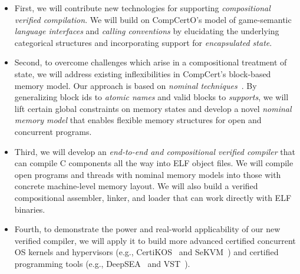 \begin{itemize} \itemsep 0pt
\item First, we will contribute new technologies for supporting {\em
  compositional verified compilation}.
  We will build on CompCertO's model of
  game-semantic {\em language interfaces} and {\em calling conventions}
  by elucidating the underlying categorical structures
  and incorporating support for {\em encapsulated state}.
\item Second, to overcome challenges which arise
  in a compositional treatment of state,
  we will address existing inflexibilities
  in CompCert's block-based memory model.
  Our approach is based on \emph{nominal
  techniques}~\cite{pitts-nominal,gabby2002}. By generalizing block
  ids to {\em atomic names} and valid blocks to {\em supports},
  we will lift certain global constraints on memory states and develop a
  novel {\em nominal memory model} that enables flexible memory
  structures for open and concurrent programs.
\item Third, we will develop an {\em end-to-end and compositional
  verified compiler} that can compile C components all the way into
  ELF object files. We will compile open programs and threads with
  nominal memory models into those with concrete machine-level memory
  layout. We will also build a verified compositional assembler,
  linker, and loader that can work directly with ELF binaries.
\item Fourth, to demonstrate the power and real-world applicability of
  our new verified compiler, we will apply it to build more advanced
  certified concurrent OS kernels and hypervisors (e.g., CertiKOS~\cite{certikos-osdi16}
  and SeKVM~\cite{sekvm21a,sekvm21b,tao21}) and certified programming tools
    (e.g., DeepSEA~\cite{deepsea19} and VST~\cite{appel11:vst}).
\end{itemize}
